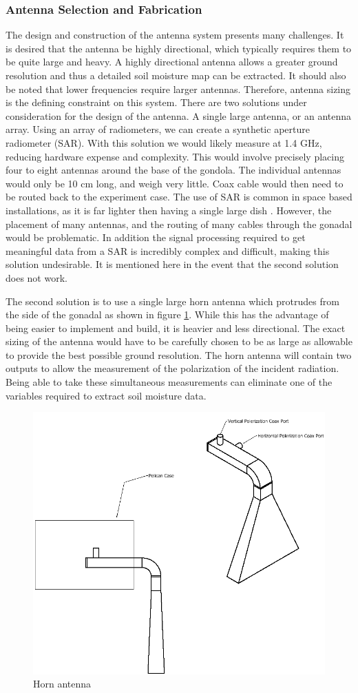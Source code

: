 \documentclass[12pt]{article}
\begin{document}
\subsubsection{Antenna Selection and Fabrication} \label{sec:antenna}

The design and construction of the antenna system presents many challenges. It is desired that the antenna be highly directional, which typically requires them to be quite large and heavy. A highly directional antenna allows a greater ground resolution and thus a detailed soil moisture map can be extracted. It should also be noted that lower frequencies require larger antennas. Therefore, antenna sizing is the defining constraint on this system. There are two solutions under consideration for the design of the antenna. A single large antenna, or an antenna array. Using an array of radiometers, we can create a synthetic aperture radiometer (SAR). With this solution we would likely measure at 1.4 GHz, reducing hardware expense and complexity. This would involve precisely placing four to eight antennas around the base of the gondola. The individual antennas would only be 10 cm long, and weigh very little. Coax cable would then need to be routed back to the experiment case. The use of SAR is common in space based installations, as it is far lighter then having a single large dish \cite{skou1989microwave}. However, the placement of many antennas, and the routing of many cables through the gonadal would be problematic. In addition the signal processing required to get meaningful data from a SAR is incredibly complex and difficult, making this solution undesirable. It is mentioned here in the event that the second solution does not work. 

The second solution is to use a single large horn antenna which protrudes from the side of the gonadal as shown in figure \ref{fig:antenna}. While this has the advantage of being easier to implement and build, it is heavier and less directional. The exact sizing of the antenna would have to be carefully chosen to be as large as allowable to provide the best possible ground resolution. The horn antenna will contain two outputs to allow the measurement of the polarization of the incident radiation\cite{constantine2005antenna}. Being able to take these simultaneous measurements can eliminate one of the variables required to extract soil moisture data.

\begin{figure}
	\centering
	\includegraphics[width=0.5\linewidth]{Figures/rough_antenna.png}
	\caption{Horn antenna}
	\label{fig:antenna}
\end{figure}
\end{document}
